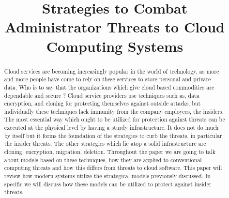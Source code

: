 \documentclass[conference]{IEEEtran}
\begin{document}
\title{Strategies to Combat Administrator Threats to Cloud Computing Systems}
\author{
  \and
}

\maketitle

\begin{abstract}
  Cloud services are becoming increasingly popular in the world of technology, as more and more people have come to rely on these services to store personal and private data. Who is to say that the organizations which give cloud based commodities are dependable and secure ? Cloud service providers use techniques such as, data encryption, and cloning for protecting themselves against outside attacks, but individually these techniques lack immunity from the company employees, the insiders. The most essential way which ought to be utilized for protection against threats can be executed at the physical level by having a sturdy infrastructure. It does not do much by itself but it forms the foundation of the strategies to curb the threats, in particular the insider threats. The other strategies which lie atop a solid infrastructure are cloning, encryption, migration, deletion. Throughout the paper we are going to talk about models based on these techniques, how they are applied to conventional computing threats and how this differs from threats to cloud software. This paper will review how modern systems utilize the strategical models previously discussed. In specific we will discuss how these models can be utilized to protect against insider threats\cite{baumann}.
\end{abstract}

\IEEEpeerreviewmaketitle











\end{document}
